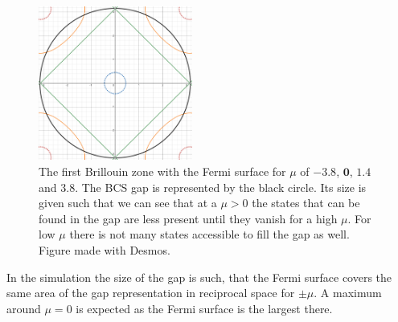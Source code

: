 \documentclass[..\main.tex]{subfile}
\begin{document}
\begin{figure}[H]
  \centering
  \includegraphics[width=0.45\textwidth]{Ressources/GapBrillouin.png}
  \caption{The first Brillouin zone with the Fermi surface for $\mu$ of \textcolor{Brillou1}{$\bm{-3.8}$}, \textcolor{Brillou2}{$\bm{0}$},
  \textcolor{Brillou3}{$\bm{1.4}$} and \textcolor{Brillou4}{$\bm{3.8}$}. The BCS gap is represented by the black circle. Its size is given such that 
  we can see that at a $\mu>0$ the states that can be found in the gap are less present until they vanish for a high $\mu$. For low $\mu$ there is
  not many states accessible to fill the gap as well. Figure made with Desmos.}
  \label{fig:Brillouin}
\end{figure}
In the simulation the size of the gap is such, that the Fermi surface 
covers the same area of the gap representation in reciprocal space for $\pm\mu$.
A maximum around $\mu=0$ is expected as the Fermi surface is the largest there.   
\end{document}

